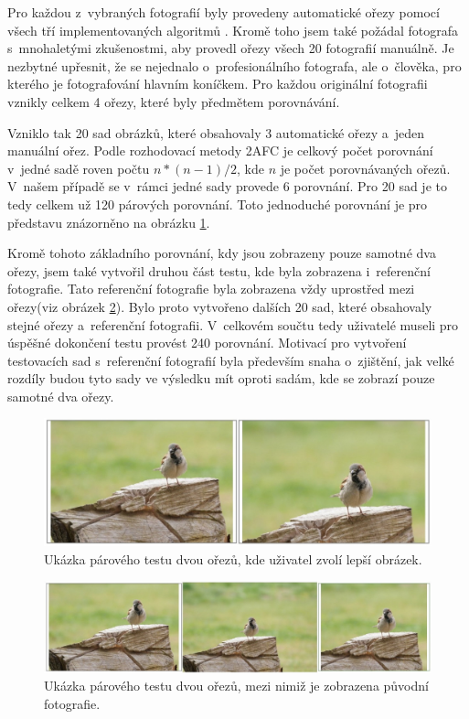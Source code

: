 Pro každou z~vybraných fotografií byly provedeny automatické ořezy pomocí všech tří implementovaných algoritmů \cite{Fang2014,Stentiford2007,Suh2003}. Kromě toho jsem také požádal fotografa s~mnohaletými zkušenostmi, aby provedl ořezy všech 20 fotografií manuálně. Je nezbytné upřesnit, že se nejednalo o~profesionálního fotografa, ale o~člověka, pro kterého je fotografování hlavním koníčkem. Pro každou originální fotografii vznikly celkem 4 ořezy, které byly předmětem porovnávání.

Vzniklo tak 20 sad obrázků, které obsahovaly 3 automatické ořezy a~jeden manuální ořez. Podle rozhodovací metody 2AFC je celkový počet porovnání v~jedné sadě roven počtu $n*(n-1)/2$, kde $n$ je počet porovnávaných ořezů. V~našem případě se v~rámci jedné sady provede 6 porovnání. Pro 20 sad je to tedy celkem už 120 párových porovnání. Toto jednoduché porovnání je pro představu znázorněno na obrázku \ref{obr:TestUkazka2}.

Kromě tohoto základního porovnání, kdy jsou zobrazeny pouze samotné dva ořezy, jsem také vytvořil druhou část testu, kde byla zobrazena i~referenční fotografie. Tato referenční fotografie byla zobrazena vždy uprostřed mezi ořezy(viz obrázek \ref{obr:TestUkazka3}). Bylo proto vytvořeno dalších 20 sad, které obsahovaly stejné ořezy a~referenční fotografii. V~celkovém součtu tedy uživatelé museli pro úspěšné dokončení testu provést 240 porovnání. Motivací pro vytvoření testovacích sad s~referenční fotografií byla především snaha o~zjištění, jak velké rozdíly budou tyto sady ve výsledku mít oproti sadám, kde se zobrazí pouze samotné dva ořezy.

\begin{figure}[H]
	\centering
	\includegraphics[scale=1.0]{obrazky/TEST2.jpg}
	\caption{Ukázka párového testu dvou ořezů, kde uživatel zvolí lepší obrázek.}
\label{obr:TestUkazka2}
\end{figure}

\begin{figure}[H]
	\centering
	\includegraphics[scale=1.0]{obrazky/TEST3.jpg}
	\caption{Ukázka párového testu dvou ořezů, mezi nimiž je zobrazena původní fotografie.}
\label{obr:TestUkazka3}
\end{figure}

